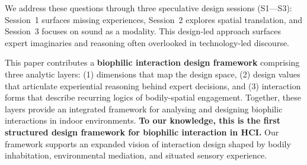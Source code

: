 We address these questions through three speculative design sessions (S1---S3): Session~1 surfaces missing experiences, Session~2 explores spatial translation, and Session~3 focuses on sound as a modality. This design-led approach surfaces expert imaginaries and reasoning often overlooked in technology-led discourse.

This paper contributes a \textbf{biophilic interaction design framework} comprising three analytic layers: (1) dimensions that map the design space, (2) design values that articulate experiential reasoning behind expert decisions, and (3) interaction forms that describe recurring logics of bodily-spatial engagement. Together, these layers provide an integrated framework for analysing and designing biophilic interactions in indoor environments. \textbf{To our knowledge, this is the first structured design framework for biophilic interaction in HCI.} Our framework supports an expanded vision of interaction design shaped by bodily inhabitation, environmental mediation, and situated sensory experience.